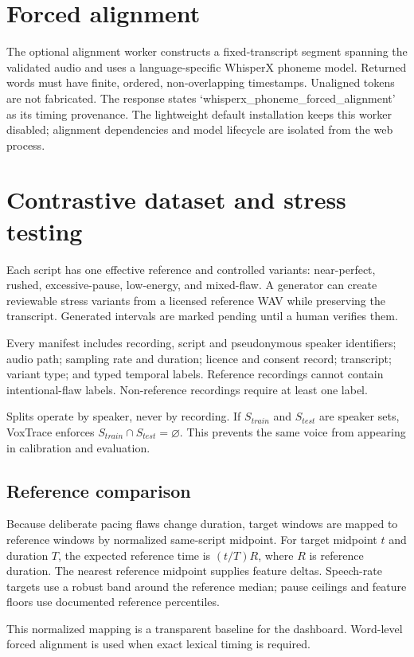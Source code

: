 \documentclass[10pt]{article}
\begin{document}
\section{Forced alignment}
The optional alignment worker constructs a fixed-transcript segment spanning the validated audio and uses a language-specific WhisperX phoneme model. Returned words must have finite, ordered, non-overlapping timestamps. Unaligned tokens are not fabricated. The response states `whisperx\_phoneme\_forced\_alignment' as its timing provenance. The lightweight default installation keeps this worker disabled; alignment dependencies and model lifecycle are isolated from the web process.

\newpage
\section{Contrastive dataset and stress testing}
Each script has one effective reference and controlled variants: near-perfect, rushed, excessive-pause, low-energy, and mixed-flaw. A generator can create reviewable stress variants from a licensed reference WAV while preserving the transcript. Generated intervals are marked pending until a human verifies them.

Every manifest includes recording, script and pseudonymous speaker identifiers; audio path; sampling rate and duration; licence and consent record; transcript; variant type; and typed temporal labels. Reference recordings cannot contain intentional-flaw labels. Non-reference recordings require at least one label.

Splits operate by speaker, never by recording. If $S_{train}$ and $S_{test}$ are speaker sets, VoxTrace enforces $S_{train}\cap S_{test}=\varnothing$. This prevents the same voice from appearing in calibration and evaluation.

\subsection{Reference comparison}
Because deliberate pacing flaws change duration, target windows are mapped to reference windows by normalized same-script midpoint. For target midpoint $t$ and duration $T$, the expected reference time is $(t/T)R$, where $R$ is reference duration. The nearest reference midpoint supplies feature deltas. Speech-rate targets use a robust band around the reference median; pause ceilings and feature floors use documented reference percentiles.

This normalized mapping is a transparent baseline for the dashboard. Word-level forced alignment is used when exact lexical timing is required.
\end{document}

